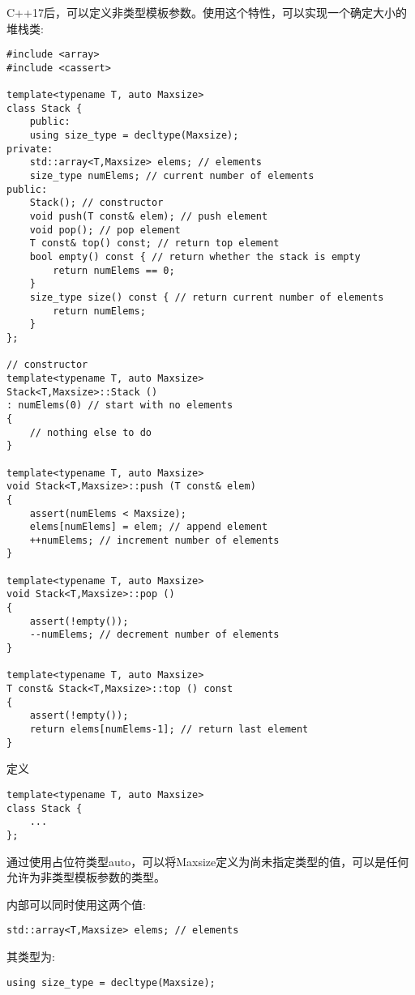 C++17后，可以定义非类型模板参数。使用这个特性，可以实现一个确定大小的堆栈类:

\begin{lstlisting}[style=styleCXX]
#include <array>
#include <cassert>

template<typename T, auto Maxsize>
class Stack {
	public:
	using size_type = decltype(Maxsize);
private:
	std::array<T,Maxsize> elems; // elements
	size_type numElems; // current number of elements
public:
	Stack(); // constructor
	void push(T const& elem); // push element
	void pop(); // pop element
	T const& top() const; // return top element
	bool empty() const { // return whether the stack is empty
		return numElems == 0;
	}
	size_type size() const { // return current number of elements
		return numElems;
	}
};

// constructor
template<typename T, auto Maxsize>
Stack<T,Maxsize>::Stack ()
: numElems(0) // start with no elements
{
	// nothing else to do
}

template<typename T, auto Maxsize>
void Stack<T,Maxsize>::push (T const& elem)
{
	assert(numElems < Maxsize);
	elems[numElems] = elem; // append element
	++numElems; // increment number of elements
}

template<typename T, auto Maxsize>
void Stack<T,Maxsize>::pop ()
{
	assert(!empty());
	--numElems; // decrement number of elements
}

template<typename T, auto Maxsize>
T const& Stack<T,Maxsize>::top () const
{
	assert(!empty());
	return elems[numElems-1]; // return last element
}
\end{lstlisting}

定义

\begin{lstlisting}[style=styleCXX]
template<typename T, auto Maxsize>
class Stack {
	...
};
\end{lstlisting}

通过使用占位符类型auto，可以将Maxsize定义为尚未指定类型的值，可以是任何允许为非类型模板参数的类型。

内部可以同时使用这两个值:

\begin{lstlisting}[style=styleCXX]
std::array<T,Maxsize> elems; // elements
\end{lstlisting}

其类型为:

\begin{lstlisting}[style=styleCXX]
using size_type = decltype(Maxsize);
\end{lstlisting}

